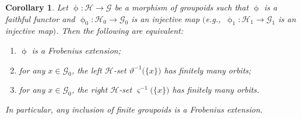 \documentclass[10pt,a4paper]{amsart}
\numberwithin{equation}{section}
\newtheorem{Corollary}[Theorem]{Corollary}
\newcommand{\Go}{\cG_{\Sscript{0}}}
\newcommand{\Ga}{\cG_{\Sscript{1}}}
\newcommand{\Ho}{\cH_{\Sscript{0}}}
\newcommand{\Ha}{\cH_{\Sscript{1}}}
\newcommand{\cG}{{\mathcal G}}
\newcommand{\cH}{{\mathcal H}}
\newcommand{\Sscript}[1]{\scriptscriptstyle{#1}}
\newcommand{\phia}{\upphi_{\Sscript{1}}}
\begin{document}
\begin{Corollary}\label{coro:Finite}Let $\upphi\colon \cH \to \cG$ be a morphism of groupoids such that $\upphi$ is a faithful functor and $\upphi_{\Sscript{0}}\colon \Ho \to \Go$ is an injective map $($e.g.,~$\phia\colon \Ha \to \Ga$ is an injective map$)$. Then the following are equivalent:
\begin{enumerate}[$(a)$]\itemsep=0pt
\item $\upphi$ is a Frobenius extension;
\item for any $x \in \Go$, the left $\cH$-set $\vartheta^{-1}\big( \{x\} \big)$ has finitely many orbits;
\item for any $x \in \Go$, the right $\cH$-set $\varsigma^{-1}\big( \{x\} \big)$ has finitely many orbits.
\end{enumerate}
In particular, any inclusion of finite groupoids is a Frobenius
extension.
\end{Corollary}
\end{document}
